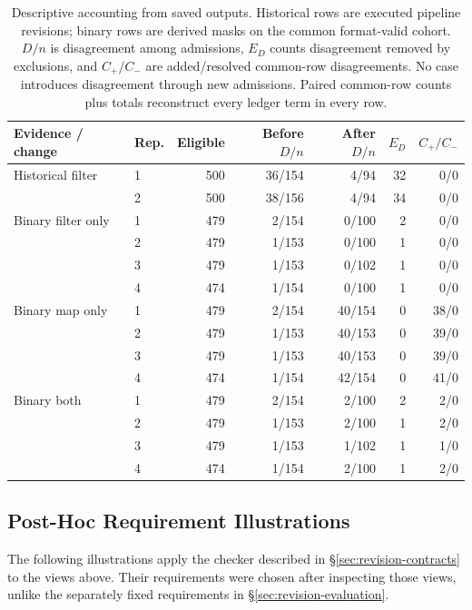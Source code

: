 \documentclass[11pt]{article}
\begin{document}
\begin{table}[t]
\centering
\small
\caption{Descriptive accounting from saved outputs. Historical rows are
executed pipeline revisions; binary rows are derived masks on the common
format-valid cohort. $D/n$ is disagreement among admissions, $E_D$ counts
disagreement removed by exclusions, and $C_+$/$C_-$ are added/resolved
common-row disagreements. No case introduces disagreement through new
admissions. Paired common-row counts plus totals reconstruct every ledger
term in every row.}
\label{tab:reporting-comparison}
\begin{tabular}{llrrrrr}
\toprule
Evidence / change & Rep. & Eligible & Before $D/n$ & After $D/n$ & $E_D$ & $C_+/C_-$ \\
\midrule
Historical filter & 1 & 500 & 36/154 & 4/94 & 32 & 0/0 \\
 & 2 & 500 & 38/156 & 4/94 & 34 & 0/0 \\
\midrule
Binary filter only & 1 & 479 & 2/154 & 0/100 & 2 & 0/0 \\
 & 2 & 479 & 1/153 & 0/100 & 1 & 0/0 \\
 & 3 & 479 & 1/153 & 0/102 & 1 & 0/0 \\
 & 4 & 474 & 1/154 & 0/100 & 1 & 0/0 \\
Binary map only & 1 & 479 & 2/154 & 40/154 & 0 & 38/0 \\
 & 2 & 479 & 1/153 & 40/153 & 0 & 39/0 \\
 & 3 & 479 & 1/153 & 40/153 & 0 & 39/0 \\
 & 4 & 474 & 1/154 & 42/154 & 0 & 41/0 \\
Binary both & 1 & 479 & 2/154 & 2/100 & 2 & 2/0 \\
 & 2 & 479 & 1/153 & 2/100 & 1 & 2/0 \\
 & 3 & 479 & 1/153 & 1/102 & 1 & 1/0 \\
 & 4 & 474 & 1/154 & 2/100 & 1 & 2/0 \\
\bottomrule
\end{tabular}
\end{table}

\subsection{Post-Hoc Requirement Illustrations}
\label{app:requirement-illustrations}
The following illustrations apply the checker described in
\S\ref{sec:revision-contracts} to the views above. Their requirements were
chosen after inspecting those views, unlike the separately fixed requirements
in \S\ref{sec:revision-evaluation}.
\end{document}
